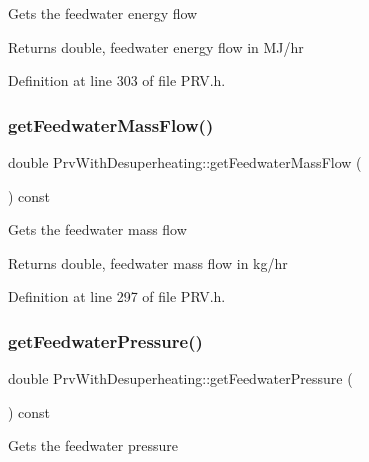 Gets the feedwater energy flow \begin{DoxyReturn}{Returns}
double, feedwater energy flow in M\+J/hr 
\end{DoxyReturn}


Definition at line 303 of file P\+R\+V.\+h.

\mbox{\label{class_prv_with_desuperheating_a9bd8ee7d5b563110a7279102352b8f4d}} 
\subsubsection{\texorpdfstring{get\+Feedwater\+Mass\+Flow()}{getFeedwaterMassFlow()}}
{\footnotesize\ttfamily double Prv\+With\+Desuperheating\+::get\+Feedwater\+Mass\+Flow (\begin{DoxyParamCaption}{ }\end{DoxyParamCaption}) const\hspace{0.3cm}{\ttfamily [inline]}}

Gets the feedwater mass flow \begin{DoxyReturn}{Returns}
double, feedwater mass flow in kg/hr 
\end{DoxyReturn}


Definition at line 297 of file P\+R\+V.\+h.

\mbox{\label{class_prv_with_desuperheating_a260bbe19272694af509fb408a821b041}} 
\subsubsection{\texorpdfstring{get\+Feedwater\+Pressure()}{getFeedwaterPressure()}}
{\footnotesize\ttfamily double Prv\+With\+Desuperheating\+::get\+Feedwater\+Pressure (\begin{DoxyParamCaption}{ }\end{DoxyParamCaption}) const\hspace{0.3cm}{\ttfamily [inline]}}

Gets the feedwater pressure

